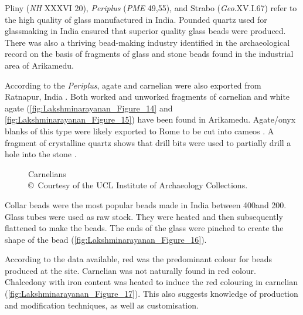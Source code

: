 
Pliny (\emph{NH} XXXVI 20), \emph{Periplus} (\emph{PME} 49,55), and Strabo (\emph{Geo}.XV.I.67) refer to the high quality of glass manufactured in India. Pounded quartz used for glassmaking in India ensured that superior quality glass beads were produced. There was also a thriving bead-making industry identified in the archaeological record on the basis of fragments of glass and stone beads found in the industrial area of Arikamedu.

According to the \emph{Periplus}, agate and carnelian were also exported from Ratnapur, India \parencite[][127]{chandra1977}. Both worked and unworked fragments of carnelian and white agate (\cref{fig:Lakshminarayanan_Figure_14} and \cref{fig:Lakshminarayanan_Figure_15}) have been found in Arikamedu. Agate/onyx blanks of this type were likely exported to Rome to be cut into cameos \parencite[][181]{sidebotham2008}. A fragment of crystalline quartz shows that drill bits were used to partially drill a hole into the stone \parencite{gwinett1988}.

\begin{figure}[!tb]
\hfill
{}
\hfill
{}

\caption{Carnelians\\
		{\normalfont\scriptsize\copyright\ Courtesy of the UCL Institute of Archaeology Collections.
	}}
	\label{fig:Lakshminarayanan_Figure_14-16}
\end{figure}

Collar beads were the most popular beads made in India between 400\BC and 200\AD \parencite[][117]{francis1986}. Glass tubes were used as raw stock. They were heated and then subsequently flattened to make the beads. The ends of the glass were pinched to create the shape of the bead (\cref{fig:Lakshminarayanan_Figure_16}).

According to the data available, red was the predominant colour for beads produced at the site. Carnelian was not naturally found in red colour. Chalcedony with iron content was heated to induce the red colouring in carnelian (\cref{fig:Lakshminarayanan_Figure_17}). This also suggests knowledge of production and modification techniques, as well as customisation.

